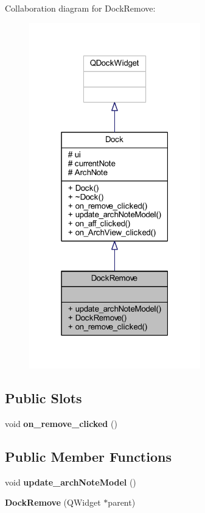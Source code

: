 Collaboration diagram for Dock\+Remove\+:
\nopagebreak
\begin{figure}[H]
\begin{center}
\leavevmode
\includegraphics[width=211pt]{class_dock_remove__coll__graph}
\end{center}
\end{figure}
\subsection*{Public Slots}
\begin{DoxyCompactItemize}
\item 
\mbox{\label{class_dock_remove_af674d9505592df25cd5b08328c0cdbd6}} 
void {\bfseries on\+\_\+remove\+\_\+clicked} ()
\end{DoxyCompactItemize}
\subsection*{Public Member Functions}
\begin{DoxyCompactItemize}
\item 
\mbox{\label{class_dock_remove_a4e653c9a21161b7d76c9cfd330579047}} 
void {\bfseries update\+\_\+arch\+Note\+Model} ()
\item 
\mbox{\label{class_dock_remove_aa2665bd1459600d9346029df9f2bba27}} 
{\bfseries Dock\+Remove} (Q\+Widget $\ast$parent)
\end{DoxyCompactItemize}
